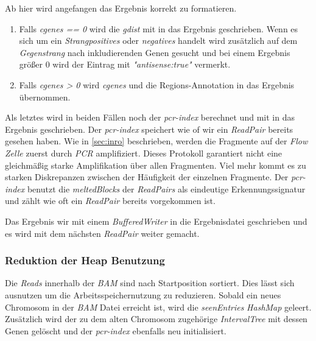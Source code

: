 \documentclass[12pt]{article}
\begin{document}
Ab hier wird angefangen das Ergebnis korrekt zu formatieren.
\begin{enumerate}
    \item Falls \textit{cgenes == 0} wird die \textit{gdist} mit in das Ergebnis geschrieben.
      Wenn es sich um ein \textit{Strangpositives} oder \textit{negatives} handelt wird 
      zusätzlich auf dem \textit{Gegenstrang} nach inkludierenden Genen gesucht und bei
      einem Ergebnis grö\ss er 0 wird der Eintrag mit \textit{"antisense:true"} vermerkt.
    \item Falls \textit{cgenes > 0} wird \textit{cgenes} und die Regions-Annotation in das
        Ergebnis übernommen.
\end{enumerate}
Als letztes wird in beiden Fällen noch der \textit{pcr-index} berechnet und mit in das Ergebnis geschrieben.
Der \textit{pcr-index} speichert wie of wir ein \textit{ReadPair} bereits gesehen haben.
Wie in \ref{sec:inro} beschrieben, werden die Fragmente auf der \textit{Flow Zelle} zuerst durch \textit{PCR}
amplifiziert. Dieses Protokoll garantiert nicht eine gleichmä\ss ig starke Amplifikation über allen
Fragmenten. Viel mehr kommt es zu starken Diskrepanzen zwischen der Häufigkeit der einzelnen Fragmente. 
Der \textit{pcr-index} benutzt die \textit{meltedBlocks} der \textit{ReadPairs} als eindeutige Erkennungssignatur 
und zählt wie oft ein \textit{ReadPair} bereits vorgekommen ist.

Das Ergebnis wir mit einem \textit{BufferedWriter} in die Ergebnisdatei geschrieben und es wird mit dem nächsten 
\textit{ReadPair} weiter gemacht.

\subsubsection{Reduktion der Heap Benutzung}
Die \textit{Reads} innerhalb der \textit{BAM} sind nach Startposition sortiert. 
Dies lässt sich ausnutzen um die Arbeitsspeichernutzung zu reduzieren. Sobald
ein neues Chromosom in der \textit{BAM} Datei erreicht ist, wird die \textit{seenEntries} \textit{HashMap}
geleert. Zusätzlich wird der zu dem alten Chromosom zugehörige \textit{IntervalTree} mit dessen 
Genen gelöscht und der \textit{pcr-index} ebenfalls neu initialisiert.
\end{document}
